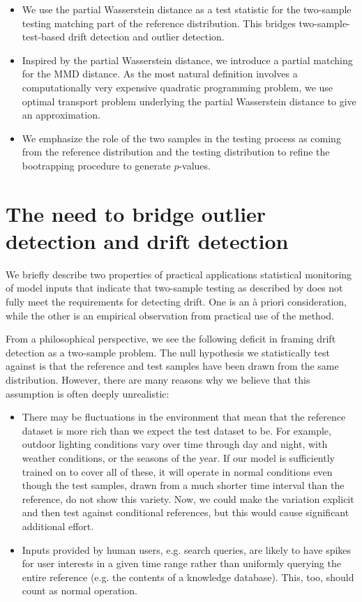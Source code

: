 \documentclass[a4paper,twoside,10pt]{article}
\theoremstyle{plain}
\theoremstyle{remark}
\begin{document}
\begin{itemize}
\item We use the partial Wasserstein distance as a test statistic for the two-sample testing matching part of the reference distribution.
  This bridges two-sample-test-based drift detection and outlier detection.
\item Inspired by the partial Wasserstein distance, we introduce a partial matching for the MMD distance. As the most natural definition involves a computationally very expensive quadratic programming problem, we use optimal transport problem underlying the partial Wasserstein distance to give an approximation.
\item We emphasize the role of the two samples in the testing process as coming from the reference distribution and the testing distribution to refine the bootrapping procedure to generate $p$-values.
\end{itemize}

\section{The need to bridge outlier detection and drift detection}

We briefly describe two properties of practical applications statistical monitoring of model inputs that indicate that two-sample testing as described by \cite{FailingLoudly} does not fully meet the requirements for detecting drift. One is an à priori consideration, while the other is an empirical observation from practical use of the method.

From a philosophical perspective, we see the following deficit in framing drift detection as a two-sample problem. The null hypothesis we statistically test against is that the reference and test samples have  been drawn from the same distribution. However, there are many reasons why we believe that this assumption is often deeply unrealistic:

\begin{itemize}
\item There may be fluctuations in the environment that mean that the reference dataset is more rich than we expect the test dataset to be. For example, outdoor lighting conditions vary over time through day and night, with weather conditions, or the seasons of the year. If our model is sufficiently trained on to cover all of these, it will operate in normal conditions even though the test samples, drawn from a much shorter time interval than the reference, do not show this variety. Now, we could make the variation explicit and then test against conditional references, but this would cause significant additional effort.
\item Inputs provided by human users, e.g. search queries, are likely to have spikes for user interests in a given time range rather than uniformly querying the entire reference
  (e.g. the contents of a knowledge database). This, too, should count as normal operation. 
\end{itemize}
\end{document}
